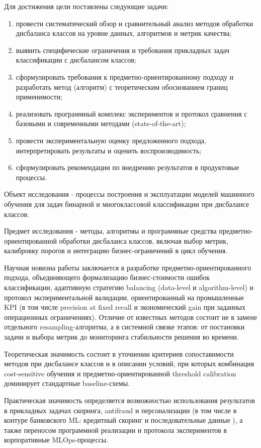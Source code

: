 Для достижения цели поставлены следующие задачи:
\begin{enumerate}
    \item провести систематический обзор и сравнительный анализ методов обработки дисбаланса классов на уровне данных, алгоритмов и метрик качества;
    \item выявить специфические ограничения и требования прикладных задач классификации с дисбалансом классов;
    \item сформулировать требования к предметно-ориентированному подходу и разработать метод (алгоритм) с теоретическим обоснованием границ применимости;
    \item реализовать программный комплекс экспериментов и протокол сравнения с базовыми и современными методами (state-of-the-art);
    \item провести экспериментальную оценку предложенного подхода, интерпретировать результаты и оценить воспроизводимость;
    \item сформулировать рекомендации по внедрению результатов в продуктовые процессы.
\end{enumerate}

Объект исследования - процессы построения и эксплуатации моделей машинного обучения для задач бинарной и многоклассовой классификации при дисбалансе классов.

Предмет исследования - методы, алгоритмы и программные средства предметно-ориентированной обработки дисбаланса классов, включая выбор метрик, калибровку порогов и интеграцию бизнес-ограничений в цикл обучения.

Научная новизна работы заключается в разработке предметно-ориентированного подхода, объединяющего формализацию бизнес-стоимости ошибок классификации, адаптивную стратегию balancing (data-level и algorithm-level) и протокол экспериментальной валидации, ориентированный на промышленные KPI (в том числе precision at fixed recall и экономический gain при заданных операционных ограничениях). Отличие от известных методов состоит не в замене отдельного resampling-алгоритма, а в системной связке этапов: от постановки задачи и выбора метрик до мониторинга стабильности решения во времени.

Теоретическая значимость состоит в уточнении критериев сопоставимости методов при дисбалансе классов и в описании условий, при которых комбинация cost-sensitive обучения и предметно-ориентированной threshold calibration доминирует стандартные baseline-схемы.

Практическая значимость определяется возможностью использования результатов в прикладных задачах скоринга, antifraud и персонализации (в том числе в контуре банковского ML: кредитный скоринг и последовательные данные \cite{smirnov2022habrbki,smirnov2024habranna}), а также переносом программной реализации и протокола экспериментов в корпоративные MLOps-процессы.

